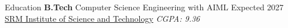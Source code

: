\documentclass{resume} %
\begin{document}















\begin{rSection}{Education}
    \textbf{B.Tech} Computer Science Engineering with AIML \hfill Expected 2027\\
\href{https://www.linkedin.com/school/s.r.m.-institute-of-science-&-technology-chennai/}{SRM Institute of Science and Technology} \hfill \textit{CGPA: 9.36}

\end{rSection}
\end{document}
